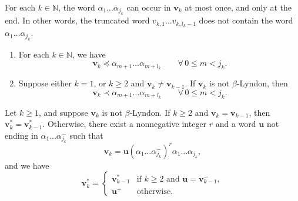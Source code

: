 \documentclass[10pt,a4paper]{amsart}
\newcommand{\N}{\ensuremath{\mathbb{N}}}
\newcommand{\al}{\alpha}
\newcommand{\lle}{\preccurlyeq}
\renewcommand{\u}{\mathbf{u}}
\renewcommand{\v}{\mathbf{v}}
\begin{document}
\begin{lemma} \label{lem:header-suffix}
For each $k\in\N$, the word $\al_1\dots\al_{j_k}$ can occur in $\v_k$ at most once, and only at the end. In other words, the truncated word $v_{k,1}\dots v_{k,l_k-1}$ does not contain the word $\al_1\dots\al_{j_k}$.
\end{lemma}

\begin{lemma} \label{lem:v_k-upper-bound}
\begin{enumerate}[{\rm(i)}]
\item For each $k\in\N$, we have
\begin{equation} \label{eq:v_k-upper-bound}
\v_k\lle\al_{m+1}\dots \al_{m+l_k} \qquad\forall\, 0\leq m<j_k.
\end{equation}
\item Suppose either $k=1$, or $k\geq 2$ and $\v_k\neq \v_{k-1}$. If $\v_k$ is not $\beta$-Lyndon, then
\begin{equation} \label{eq:strict-v_k-upper-bound}
\v_k\prec\al_{m+1}\dots \al_{m+l_k} \qquad\forall\, 0\leq m<j_k.
\end{equation}
\end{enumerate}
\end{lemma}

\begin{lemma} \label{lem:v_k-star}
Let $k\geq 1$, and suppose $\v_k$ is not $\beta$-Lyndon. If $k\geq 2$ and $\v_k=\v_{k-1}$, then $\v_k^*=\v_{k-1}^*$. Otherwise, there exist a nonnegative integer $r$ and a word $\u$ not ending in $\al_1\dots\al_{j_k}^-$ such that
\begin{equation} \label{eq:v_k-expression}
\v_k=\u(\al_1\dots\al_{j_k}^-)^r\al_1\dots\al_{j_k},
\end{equation}
and we have
\begin{equation} \label{eq:v_k-star}
\v_k^*=\begin{cases}
\v_{k-1}^* & \mbox{if $k\geq 2$ and $\u=\v_{k-1}^-$},\\
\u^+ & \mbox{otherwise}.
\end{cases}
\end{equation}
\end{lemma}
\end{document}
